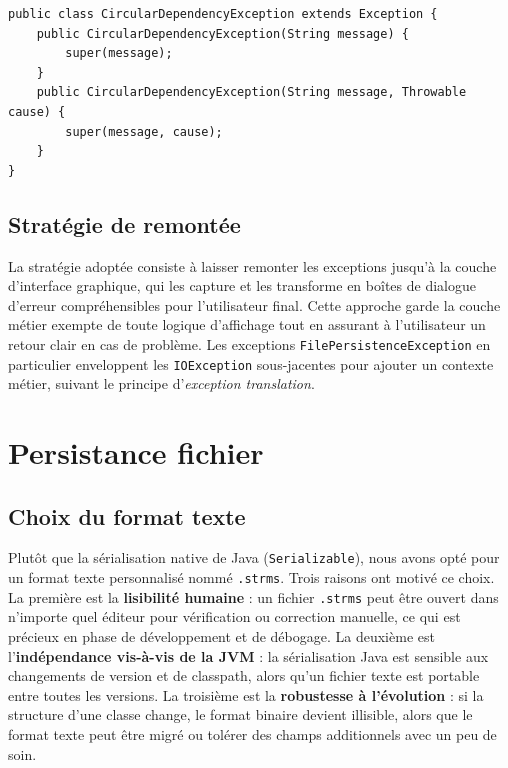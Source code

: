 \documentclass[11pt]{article}
\begin{document}
\begin{lstlisting}[caption={Exemple : CircularDependencyException}]
public class CircularDependencyException extends Exception {
    public CircularDependencyException(String message) {
        super(message);
    }
    public CircularDependencyException(String message, Throwable cause) {
        super(message, cause);
    }
}
\end{lstlisting}

\subsection{Stratégie de remontée}
La stratégie adoptée consiste à laisser remonter les exceptions jusqu'à
la couche d'interface graphique, qui les capture et les transforme en
boîtes de dialogue d'erreur compréhensibles pour l'utilisateur final.
Cette approche garde la couche métier exempte de toute logique
d'affichage tout en assurant à l'utilisateur un retour clair en cas de
problème. Les exceptions \texttt{FilePersistenceException} en
particulier enveloppent les \texttt{IOException} sous-jacentes pour
ajouter un contexte métier, suivant le principe d'\textit{exception
translation}.

\section{Persistance fichier}

\subsection{Choix du format texte}
Plutôt que la sérialisation native de Java (\texttt{Serializable}), nous
avons opté pour un format texte personnalisé nommé \texttt{.strms}. Trois
raisons ont motivé ce choix. La première est la \textbf{lisibilité
humaine} : un fichier \texttt{.strms} peut être ouvert dans n'importe
quel éditeur pour vérification ou correction manuelle, ce qui est
précieux en phase de développement et de débogage. La deuxième est
l'\textbf{indépendance vis-à-vis de la JVM} : la sérialisation Java est
sensible aux changements de version et de classpath, alors qu'un fichier
texte est portable entre toutes les versions. La troisième est la
\textbf{robustesse à l'évolution} : si la structure d'une classe change,
le format binaire devient illisible, alors que le format texte peut être
migré ou tolérer des champs additionnels avec un peu de soin.
\end{document}
